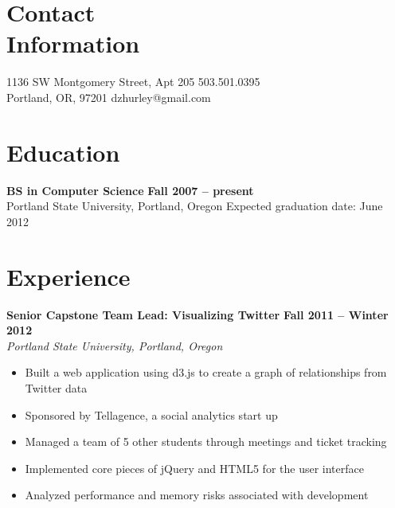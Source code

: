 \documentclass[margin,line]{resume}
\begin{document}
\begin{resume}

    \section{\mysidestyle Contact\\Information}

    1136 SW Montgomery Street, Apt 205    \hfill 503.501.0395          \vspace{0mm}\\\vspace{0mm}%
    Portland, OR, 97201                   \hfill dzhurley@gmail.com    \vspace{0mm}\\\vspace{0mm}%

    \section{\mysidestyle Education}

    \textbf{BS in Computer Science}                 \hfill \textbf{ Fall 2007 -- present}         \vspace{2mm}\\\vspace{1mm}%
    Portland State University, Portland, Oregon     \hfill Expected graduation date: June 2012    \vspace{-3mm}\\\vspace{-1mm}%

    \section{\mysidestyle Experience}

    \textbf{Senior Capstone Team Lead: Visualizing Twitter}    \hfill \textbf{Fall 2011 -- Winter 2012}    \vspace{2mm}\\\vspace{1mm}%
    \textsl{Portland State University, Portland, Oregon}
    \begin{itemize}
        \item Built a web application using d3.js to create a graph of relationships from Twitter data
        \item Sponsored by Tellagence, a social analytics start up
        \item Managed a team of 5 other students through meetings and ticket tracking
        \item Implemented core pieces of jQuery and HTML5 for the user interface
        \item Analyzed performance and memory risks associated with development
    \end{itemize}


\end{resume}
\end{document}
